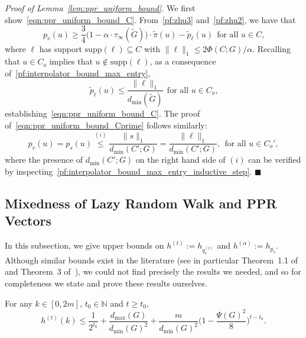 \documentclass[twoside,11pt]{article}
\newcommand{\1}{\mathbf{1}}
\newcommand{\wt}[1]{\widetilde{#1}}
\newcommand{\qed}{\hfill $\blacksquare$}
\begin{document}
\noindent\emph{Proof of Lemma~\ref{lem:ppr_uniform_bound}.}
We first show~\eqref{eqn:ppr_uniform_bound_C}. From~\eqref{pf:zhu3} and~\eqref{pf:zhu2}, we have that
\begin{equation*}
p_v(u) \geq \frac{3}{4}\bigl(1 - \alpha \cdot \tau_{\infty}(\wt{G})\bigr) \cdot \wt{\pi}(u) - \wt{p}_{\ell}(u)~~\textrm{for all $u \in C$,}
\end{equation*}
where $\ell$ has support $\mathrm{supp}(\ell) \subseteq C$ with $\|\ell\|_1 \leq 2\Phi(C;G)/\alpha$. Recalling that $u \in C_{o}$ implies that $u \not\in \mathrm{supp}(\ell)$, as a consequence of~\eqref{pf:interpolator_bound_max_entry}, 
\begin{equation*}
\wt{p}_{\ell}(u) \leq \frac{\|\ell\|_1}{d_{\min}(\wt{G})}~~\textrm{for all $u \in C_{o}$,}
\end{equation*}
establishing~\eqref{eqn:ppr_uniform_bound_C}. The proof of~\eqref{eqn:ppr_uniform_bound_Cprime} follows similarly:
\begin{equation*}
p_v(u) = p_s(u) \overset{(i)}{\leq} \frac{\|s\|_1}{d_{\min}(C';G)} = \frac{\|\ell\|_1}{d_{\min}(C';G)},~~\textrm{for all $u \in C_{o}'$},
\end{equation*}
where the presence of $d_{\min}(C';G)$ on the right hand side of $(i)$ can be verified by inspecting~\eqref{pf:interpolator_bound_max_entry_inductive_step}.  \qed	

\subsection{Mixedness of Lazy Random Walk and PPR Vectors}
\label{subsec:lovasz_simonovits_bounds}
In this subsection, we give upper bounds on $h^{(t)} := h_{q_v^{(t)}}$ and $h^{(\alpha)} := h_{p_v}$. Although similar bounds exist in the literature (see in particular Theorem~1.1 of \citep{lovasz1990} and Theorem~3 of~\citep{andersen2006}), we could not find precisely the results we needed, and so for completeness we state and prove these results ourselves. 

\begin{theorem}
	\label{thm:mixing_time_rw}
	For any $k \in [0, 2m]$, $t_0 \in \mathbb{N}$ and $t \geq t_0$,
	\begin{equation}
	\label{eqn:mixing_time_rw_1}
	h^{(t)}(k) \leq \frac{1}{2^{t_0}} + \frac{d_{\max}(G)}{d_{\min}(G)^2} + \frac{m}{d_{\min}(G)^2} \biggl(1 - \frac{\Psi(G)^2}{8}\biggr)^{t - t_0}.
	\end{equation}
\end{theorem}
\end{document}
